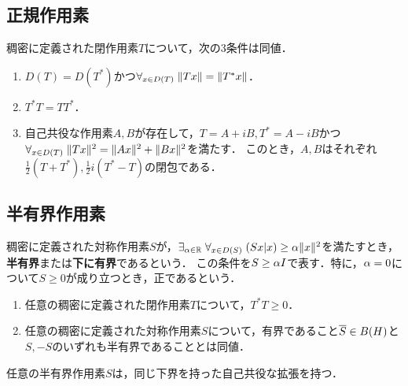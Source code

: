 \documentclass[uplatex,dvipdfmx]{jsreport}
\begin{document}
\subsection{正規作用素}

\begin{proposition}[正規作用素]\label{prop-normal-operator}
    稠密に定義された閉作用素$T$について，次の3条件は同値．
    \begin{enumerate}
        \item $D(T)=D(T^*)$かつ$\forall_{x\in D(T)}\;\|Tx\|=\|T^*x\|$．
        \item $T^*T=TT^*$．
        \item 自己共役な作用素$A,B$が存在して，$T=A+iB,T^*=A-iB$かつ$\forall_{x\in D(T)}\;\|Tx\|^2=\|Ax\|^2+\|Bx\|^2$を満たす．
        このとき，$A,B$はそれぞれ$\frac{1}{2}(T+T^*),\frac{1}{2}i(T^*-T)$の閉包である．
    \end{enumerate}
\end{proposition}

\begin{example}[可換性の取扱に関するNelsonの例]
    
    
\end{example}

\subsection{半有界作用素}

\begin{definition}
    稠密に定義された対称作用素$S$が，$\exists_{\alpha\in\mathbb{R}}\;\forall_{x\in D(S)}\;(Sx|x)\ge\alpha\|x\|^2$を満たすとき，\textbf{半有界}または\textbf{下に有界}であるという．
    この条件を$S\ge\alpha I$で表す．特に，$\alpha=0$について$S\ge0$が成り立つとき，正であるという．
\end{definition}

\begin{lemma}\mbox{}
    \begin{enumerate}
        \item 任意の稠密に定義された閉作用素$T$について，$T^*T\ge0$．
        \item 任意の稠密に定義された対称作用素$S$について，有界であること$\overline{S}\in B(H)$と$S,-S$のいずれも半有界であることとは同値．
    \end{enumerate}
\end{lemma}

\begin{theorem}
    任意の半有界作用素$S$は，同じ下界を持った自己共役な拡張を持つ．
\end{theorem}
\end{document}
